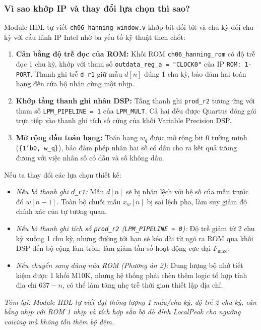 \subsubsection*{Vì sao khớp IP và thay đổi lựa chọn thì sao?}
Module HDL tự viết \texttt{ch06\_hanning\_window.v} khớp bit-đối-bit và chu-kỳ-đối-chu-kỳ với cấu hình IP Intel nhờ ba yếu tố kỹ thuật then chốt:
\begin{enumerate}[leftmargin=1.5em, itemsep=2pt]
    \item \textbf{Cân bằng độ trễ đọc của ROM:} Khối ROM \texttt{ch06\_hanning\_rom} có độ trễ đọc 1 chu kỳ, khớp với tham số \texttt{outdata\_reg\_a = "CLOCK0"} của IP \texttt{ROM: 1-PORT}. Thanh ghi trễ \texttt{d\_r1} giữ mẫu $d[n]$ đúng 1 chu kỳ, bảo đảm hai toán hạng đến cửa bộ nhân cùng một nhịp.
    \item \textbf{Khớp tầng thanh ghi nhân DSP:} Tầng thanh ghi \texttt{prod\_r2} tương ứng với tham số \texttt{LPM\_PIPELINE = 1} của \texttt{LPM\_MULT}. Cả hai đều được Quartus đóng gói trực tiếp vào thanh ghi tích số cứng của khối Variable Precision DSP.
    \item \textbf{Mở rộng dấu toán hạng:} Toán hạng $w_q$ được mở rộng bit 0 tường minh (\texttt{\{1'b0, w\_q\}}), bảo đảm phép nhân hai số có dấu cho ra kết quả tương đương với việc nhân số có dấu và số không dấu.
\end{enumerate}

Nếu ta thay đổi các lựa chọn thiết kế:
\begin{itemize}[leftmargin=1.5em, itemsep=2pt]
    \item \emph{Nếu bỏ thanh ghi \texttt{d\_r1}:} Mẫu $d[n]$ sẽ bị nhân lệch với hệ số của mẫu trước đó $w[n-1]$. Toàn bộ chuỗi mẫu $x_w[n]$ bị sai lệch pha, làm suy giảm độ chính xác của tự tương quan.
    \item \emph{Nếu bỏ thanh ghi tích số \texttt{prod\_r2} (\texttt{LPM\_PIPELINE = 0}):} Độ trễ giảm từ 2 chu kỳ xuống 1 chu kỳ, nhưng đường tới hạn sẽ kéo dài từ ngõ ra ROM qua khối DSP đến bộ cộng làm tròn, làm giảm tần số hoạt động cực đại $F_{\max}$.
    \item \emph{Nếu chuyển sang dùng nửa ROM (Phương án 2):} Dung lượng bộ nhớ tiết kiệm được 1 khối M10K, nhưng hệ thống phải chèn thêm logic tổ hợp tính địa chỉ $637 - n$, có thể làm tăng nhẹ trễ thời gian thiết lập địa chỉ.
\end{itemize}

\textit{Tóm lại: Module HDL tự viết đạt thông lượng 1 mẫu/chu kỳ, độ trễ 2 chu kỳ, cân bằng nhịp với ROM 1 nhịp và tích hợp sẵn bộ dò đỉnh LocalPeak cho ngưỡng voicing mà không tốn thêm bộ đệm.}

